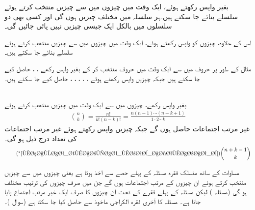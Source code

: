 بغیر واپس رکھتے ہوئے، ایک وقت میں  چیزوں میں سے   چیزیں  منتخب کرتے ہوئے  سلسلے بنائے جا سکتے ہیں۔ہر سلسلہ میں  مختلف چیزیں ہوں گی اور کسی بھی دو سلسلوں میں بالکل ایک جیسی چیزیں نہیں پائی جائیں گی۔

اس کے علاوہ، چیزوں کو واپس رکھتے ہوئے،  ایک وقت میں  چیزوں میں سے   چیزیں  منتخب کرتے ہوئے  سلسلے بنائے جا سکتے ہیں۔

مثال کے طور پر  حروف  میں سے ایک وقت میں  حروف منتخب کر کے بغیر واپس رکھے  ، ،  حاصل کیے جا سکتے ہیں جبکہ چیزیں واپس رکھتے ہوئے  ، ، ، ، ،  حاصل کیے جا سکتے ہیں۔

\quad {}\\
بغیر واپس رکھے،  چیزوں میں سے ایک وقت میں  چیزیں منتخب کرتے ہوئے
\begin{align}\label{مساوات_شماریات_مرتب_اجتماعات_ب}
\binom{n}{k}=\frac{n!}{k!(n-k)!}=\frac{n(n-1)\cdots (n-k+1)}{1\cdot 2\cdots k}
\end{align}
غیر مرتب اجتماعات حاصل ہوں گے جبکہ چیزیں واپس رکھتے ہوئے غیر مرتب اجتماعات کی تعداد درج ذیل ہو گی۔
\begin{align*}\tag{$^*$\ref{مساوات_شماریات_مرتب_اجتماعات_ب}}
\binom{n+k-1}{k}
\end{align*}

مساوات  کے ساتھ منسلک فقرہ مسئلہ   کے پہلے حصے سے اخذ ہوتا ہے یعنی  چیزوں میں سے  چیزیں منتخب کرتے ہوئے ان  چیزوں کے مرتب اجتماعات   ہوں گے جن میں صرف چیزوں کی ترتیب مختلف ہو گی (مسئلہ ) لیکن مسئلہ  کے پہلے فقرے کے تحت  ان  چیزوں کا صرف ایک غیر مرتب اجتماع پایا جاتا ہے۔ مسئلہ  کا آخری فقرہ الکراجی ماخوذ سے حاصل کیا جا سکتا ہے (سوال )۔


